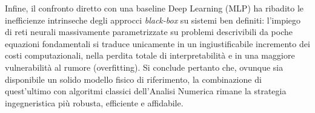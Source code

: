 \documentclass[11pt, a4paper]{article}
\begin{document}
Infine, il confronto diretto con una baseline Deep Learning (MLP) ha ribadito le inefficienze intrinseche degli approcci \textit{black-box} su sistemi ben definiti: l'impiego di reti neurali massivamente parametrizzate su problemi descrivibili da poche equazioni fondamentali si traduce unicamente in un ingiustificabile incremento dei costi computazionali, nella perdita totale di interpretabilità e in una maggiore vulnerabilità al rumore (overfitting). Si conclude pertanto che, ovunque sia disponibile un solido modello fisico di riferimento, la combinazione di quest'ultimo con algoritmi classici dell'Analisi Numerica rimane la strategia ingegneristica più robusta, efficiente e affidabile.
\end{document}
